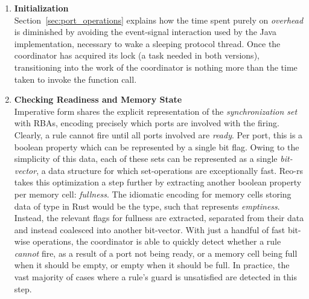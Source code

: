 \begin{enumerate}
	\item \textbf{Initialization}\\
	Section~\ref{sec:port_operations} explains how the time spent purely on \textit{overhead} is diminished by avoiding the event-signal interaction used by the Java implementation, necessary to wake a sleeping protocol thread. Once the coordinator has acquired its lock (a task needed in both versions), transitioning into the work of the coordinator is nothing more than the time taken to invoke the  function call.
	
	\item \textbf{Checking Readiness and Memory State}\\
	Imperative form shares the explicit representation of the \textit{synchronization set} with RBAs, encoding precisely which ports are involved with the firing. Clearly, a rule cannot fire until all ports involved are \textit{ready}. Per port, this is a boolean property which can be represented by a single bit flag. Owing to the simplicity of this data, each of these sets can be represented as a single \textit{bit-vector}, a data structure for which set-operations are exceptionally fast. Reo-rs takes this optimization a step further by extracting another boolean property per memory cell: \textit{fullness}. The idiomatic encoding for memory cells storing data of type  in Rust would be the  type, such that  represents \textit{emptiness}. Instead, the relevant flags for fullness are extracted, separated from their data and instead coalesced into another bit-vector. With just a handful of fast bit-wise operations, the coordinator is able to quickly detect whether a rule \textit{cannot} fire, as a result of a port not being ready, or a memory cell being full when it should be empty, or empty when it should be full. In practice, the vast majority of cases where a rule's guard is unsatisfied are detected in this step.
	

\end{enumerate}
